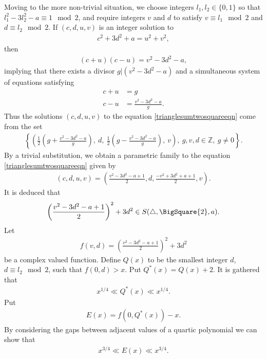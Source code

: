 \documentclass[12pt]{amsart}
\newcommand{\1}{\mathmybb{1}}
\begin{document}
Moving to the more non-trivial situation, we choose integers $l_{1},l_{2}\in \{0,1\}$ so that $l_{1}^2 - 3l_{2}^2 - a \equiv 1 \mod 2$, and require integers $v$ and $d$ to satisfy $v \equiv l_{1} \mod 2$ and $d \equiv l_{2} \mod 2$.  If $(c,d,u,v)$ is an integer solution to 
\begin{align}
\label{trianglesumtwosquareeqn}
c^2 + 3d^2 + a = u^2 + v^2,
\end{align}
then
\begin{align*}
(c+u)(c-u) = v^2-3d^2-a,
\end{align*}
implying that there exists a divisor $g|(v^2-3d^2-a)$ and a simultaneous system of equations satisfying
\begin{align*}
c+u &= g \\
c-u &= \frac{v^2-3d^2-a}{g}.
\end{align*}
Thus the solutions $(c,d,u,v)$ to the equation \eqref{trianglesumtwosquareeqn} come from the set
\begin{align*}
\left\{\left(\frac{1}{2}\left(g+\frac{v^2-3d^2-a}{g}\right), \ d, \ \frac{1}{2}\left(g-\frac{v^2-3d^2-a}{g}\right), \ v\right), \ g,v,d \in \mathbb{Z}, \ g \neq 0\right\}.
\end{align*}
By a trivial substitution, we obtain a parametric family to the equation \eqref{trianglesumtwosquareeqn} given by
\begin{align*}
(c,d,u,v) = \left(\frac{v^2-3d^2-a+1}{2}, d, \frac{-v^2+3d^2+a+1}{2}, v \right).
\end{align*}
It is deduced that 
\begin{align}
\label{parametricfamilytrianglesquarea}
\left(\frac{v^2-3d^2-a+1}{2}\right)^2 +3d^2 \in S(\triangle, \BigSquare{2},a).
\end{align}
Let
\begin{align*}
f(v,d) = \left(\frac{v^2-3d^2-a+1}{2}\right)^2 +3d^2
\end{align*}
be a complex valued function. Define $Q(x)$ to be the smallest integer $d$, $d \equiv l_{2} \mod 2$, such that $f(0,d) > x$. Put $Q^{*}(x) = Q(x)+2$. It is gathered that
\begin{align}
\label{SizeofQtrianglesquare}
x^{1/4}\ll Q^{*}(x) \ll x^{1/4}.
\end{align}
Put
\begin{align*}
E(x) = f(0,Q^{*}(x)) - x.
\end{align*}
By considering the gaps between adjacent values of a quartic polynomial we can show that 
\begin{align}
\label{Errorsizetrianglesquare}
x^{3/4}\ll E(x) \ll x^{3/4}.
\end{align}
\end{document}
